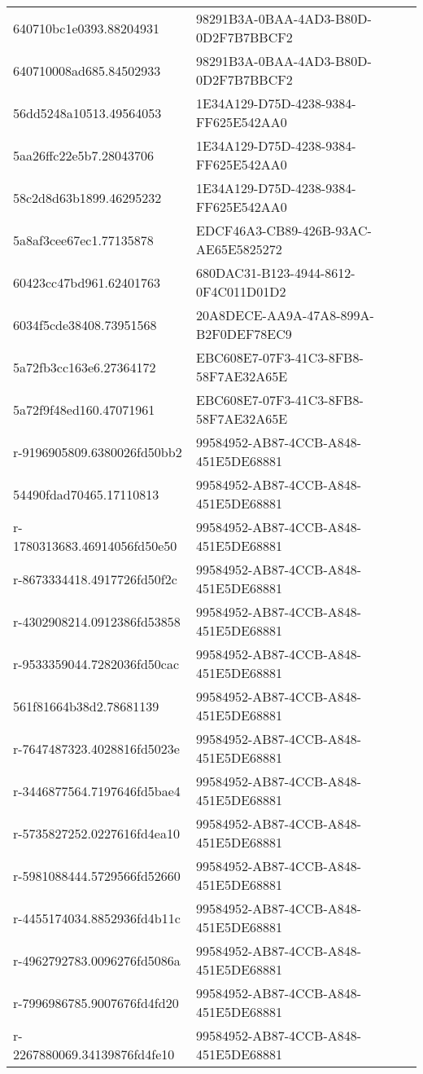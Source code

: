 \begin{tabular}{ll}
640710bc1e0393.88204931 & 98291B3A-0BAA-4AD3-B80D-0D2F7B7BBCF2 \\
640710008ad685.84502933 & 98291B3A-0BAA-4AD3-B80D-0D2F7B7BBCF2 \\
56dd5248a10513.49564053 & 1E34A129-D75D-4238-9384-FF625E542AA0 \\
5aa26ffc22e5b7.28043706 & 1E34A129-D75D-4238-9384-FF625E542AA0 \\
58c2d8d63b1899.46295232 & 1E34A129-D75D-4238-9384-FF625E542AA0 \\
5a8af3cee67ec1.77135878 & EDCF46A3-CB89-426B-93AC-AE65E5825272 \\
60423cc47bd961.62401763 & 680DAC31-B123-4944-8612-0F4C011D01D2 \\
6034f5cde38408.73951568 & 20A8DECE-AA9A-47A8-899A-B2F0DEF78EC9 \\
5a72fb3cc163e6.27364172 & EBC608E7-07F3-41C3-8FB8-58F7AE32A65E \\
5a72f9f48ed160.47071961 & EBC608E7-07F3-41C3-8FB8-58F7AE32A65E \\
r-9196905809.6380026fd50bb2 & 99584952-AB87-4CCB-A848-451E5DE68881 \\
54490fdad70465.17110813 & 99584952-AB87-4CCB-A848-451E5DE68881 \\
r-1780313683.46914056fd50e50 & 99584952-AB87-4CCB-A848-451E5DE68881 \\
r-8673334418.4917726fd50f2c & 99584952-AB87-4CCB-A848-451E5DE68881 \\
r-4302908214.0912386fd53858 & 99584952-AB87-4CCB-A848-451E5DE68881 \\
r-9533359044.7282036fd50cac & 99584952-AB87-4CCB-A848-451E5DE68881 \\
561f81664b38d2.78681139 & 99584952-AB87-4CCB-A848-451E5DE68881 \\
r-7647487323.4028816fd5023e & 99584952-AB87-4CCB-A848-451E5DE68881 \\
r-3446877564.7197646fd5bae4 & 99584952-AB87-4CCB-A848-451E5DE68881 \\
r-5735827252.0227616fd4ea10 & 99584952-AB87-4CCB-A848-451E5DE68881 \\
r-5981088444.5729566fd52660 & 99584952-AB87-4CCB-A848-451E5DE68881 \\
r-4455174034.8852936fd4b11c & 99584952-AB87-4CCB-A848-451E5DE68881 \\
r-4962792783.0096276fd5086a & 99584952-AB87-4CCB-A848-451E5DE68881 \\
r-7996986785.9007676fd4fd20 & 99584952-AB87-4CCB-A848-451E5DE68881 \\
r-2267880069.34139876fd4fe10 & 99584952-AB87-4CCB-A848-451E5DE68881 \\

\end{tabular}

